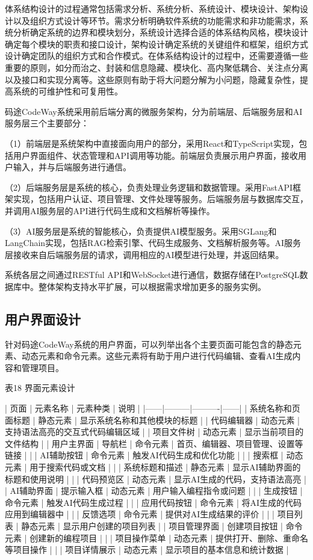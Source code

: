 \documentclass[
    report,     %
    oneside,    %
    UTF8,       %
    zihao=-4    %
]{config} %
\begin{document}
体系结构设计的过程通常包括需求分析、系统分析、系统设计、模块设计、架构设计以及组织方式设计等环节。需求分析明确软件系统的功能需求和非功能需求，系统分析确定系统的边界和模块划分，系统设计选择合适的体系结构风格，模块设计确定每个模块的职责和接口设计，架构设计确定系统的关键组件和框架，组织方式设计确定团队的组织方式和合作模式。在体系结构设计的过程中，还需要遵循一些重要的原则，如分而治之、封装和信息隐藏、模块化、高内聚低耦合、关注点分离以及接口和实现分离等。这些原则有助于将大问题分解为小问题，隐藏复杂性，提高系统的可维护性和可复用性。

码途CodeWay系统采用前后端分离的微服务架构，分为前端层、后端服务层和AI服务层三个主要部分：

（1）前端层是系统架构中直接面向用户的部分，采用React和TypeScript实现，包括用户界面组件、状态管理和API调用等功能。前端层负责展示用户界面，接收用户输入，并与后端服务进行通信。

（2）后端服务层是系统的核心，负责处理业务逻辑和数据管理。采用FastAPI框架实现，包括用户认证、项目管理、文件处理等服务。后端服务层与数据库交互，并调用AI服务层的API进行代码生成和文档解析等操作。

（3）AI服务层是系统的智能核心，负责提供AI模型服务。采用SGLang和LangChain实现，包括RAG检索引擎、代码生成服务、文档解析服务等。AI服务层接收来自后端服务层的请求，调用相应的AI模型进行处理，并返回结果。

系统各层之间通过RESTful API和WebSocket进行通信，数据存储在PostgreSQL数据库中。整体架构支持水平扩展，可以根据需求增加更多的服务实例。
\subsection{用户界面设计}

针对码途CodeWay系统的用户界面，可以列举出各个主要页面可能包含的静态元素、动态元素和命令元素。这些元素将有助于用户进行代码编辑、查看AI生成内容和管理项目。

表18 界面元素设计

| 页面 | 元素名称 | 元素种类 | 说明 | |------|---------|----------|------| | 系统名称和页面标题 | 静态元素 | 显示系统名称和其他模块的标题 | | 代码编辑器 | 动态元素 | 支持语法高亮的交互式代码编辑区域 | | 项目文件树 | 动态元素 | 显示当前项目的文件结构 | | 用户主界面 | 导航栏 | 命令元素 | 首页、编辑器、项目管理、设置等链接 | | | AI辅助按钮 | 命令元素 | 触发AI代码生成和优化功能 | | | 搜索框 | 动态元素 | 用于搜索代码或文档 | | | 系统标题和描述 | 静态元素 | 显示AI辅助界面的标题和使用说明 | | | 代码预览区 | 动态元素 | 显示AI生成的代码，支持语法高亮 | | AI辅助界面 | 提示输入框 | 动态元素 | 用户输入编程指令或问题 | | | 生成按钮 | 命令元素 | 触发AI代码生成过程 | | | 应用代码按钮 | 命令元素 | 将AI生成的代码应用到编辑器中 | | | 反馈选项 | 命令元素 | 提供对AI生成结果的评价 | | | 项目列表 | 静态元素 | 显示用户创建的项目列表 | | 项目管理界面 | 创建项目按钮 | 命令元素 | 创建新的编程项目 | | | 项目操作菜单 | 动态元素 | 提供打开、删除、重命名等项目操作 | | | 项目详情展示 | 动态元素 | 显示项目的基本信息和统计数据 |
\end{document}
